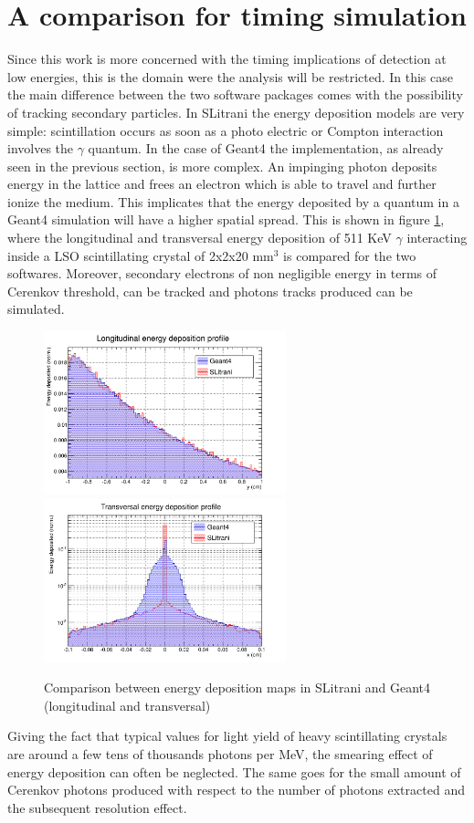 \section{A comparison for timing simulation}
Since this work is more concerned with the timing implications of detection at low energies, this is the domain were the analysis will be restricted.
In this case the main difference between the two software packages comes with the possibility of tracking secondary particles.
In SLitrani the energy deposition models are very simple: scintillation occurs as soon as a photo electric or Compton interaction involves the $\gamma$ quantum.
In the case of Geant4 the implementation, as already seen in the previous section, is more complex. An impinging photon deposits energy in the lattice and frees an electron which is able to travel and further ionize the medium.
This implicates that the energy deposited by a quantum in a Geant4 simulation will have a higher spatial spread. This is shown in figure \ref{fig:rms}, where the longitudinal and transversal energy deposition of 511 KeV $\gamma$ interacting inside a LSO scintillating crystal of 2x2x20 mm$^{3}$ is compared for the two softwares.
Moreover, secondary electrons of non negligible energy in terms of Cerenkov threshold, can be tracked and photons tracks produced can be simulated. 
\begin{figure}[htbp]
\begin{center}
\includegraphics[width=7cm]{../Pictures/Chapter_5/energy_dep.png}
\includegraphics[width=7cm]{../Pictures/Chapter_5/energy_dep_lat.png}
\end{center}
\caption[RMS comparison]{Comparison between energy deposition maps in SLitrani and Geant4 (longitudinal and transversal)}
\label{fig:rms}
\end{figure}
Giving the fact that typical values for light yield of heavy scintillating crystals are around a few tens of thousands photons per MeV, the smearing effect of energy deposition can often be neglected. The same goes for the small amount of Cerenkov photons produced with respect to the number of photons extracted and the subsequent resolution effect.

